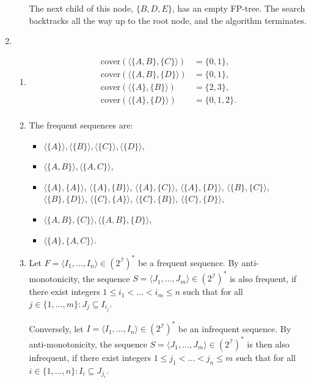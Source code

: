 \documentclass[pdf]{article}
\newcommand{\seq}[1]{\langle #1 \rangle}
\newcommand{\coverseq}[1]{\mathrm{cover}(\seq{#1})}
\begin{document}
\begin{enumerate}
\begin{enumerate}
		The next child of this node, \(\{B, D, E\}\), has an empty FP-tree.
		The search backtracks all the way up to the root node, and the algorithm terminates.
	\end{enumerate}
	\item \begin{enumerate}
		\item \begin{align*}
			\coverseq{\{A, B\}, \{C\}} &= \{0, 1\}, \\
			\coverseq{\{A, B\}, \{D\}} &= \{0, 1\}, \\
			\coverseq{\{A\}, \{B\}} &= \{2, 3\}, \\
			\coverseq{\{A\}, \{D\}} &= \{0, 1, 2\}. \\
		\end{align*}
		\item The frequent sequences are:
		\begin{itemize}
			\item \(\seq{\{A\}}, \seq{\{B\}}, \seq{\{C\}}, \seq{\{D\}}\),
			\item \(\seq{\{A, B\}}, \seq{\{A, C\}}\),
			\item \(\seq{\{A\}, \{A\}}\), \(\seq{\{A\}, \{B\}}\), \(\seq{\{A\}, \{C\}}\), \(\seq{\{A\}, \{D\}}\), \(\seq{\{B\}, \{C\}}\), \(\seq{\{B\}, \{D\}}\), \(\seq{\{C\}, \{A\}}\), \(\seq{\{C\}, \{B\}}\), \(\seq{\{C\}, \{D\}}\),
			\item \(\seq{\{A, B\}, \{C\}}, \seq{\{A, B\},\{D\}}\),
			\item \(\seq{\{A\}, \{A, C\}}\).
		\end{itemize}
		\item Let \(F = \langle I_1,\dots,I_n \rangle \in (2^\mathcal{I})^*\) be a frequent sequence.
		By anti-monotonicity, the sequence \(S = \langle J_1,\dots,J_m \rangle \in (2^\mathcal{I})^*\) is also frequent, if there exist integers \(1 \leq i_1 < \dots < i_m \leq n\) such that for all \(j\in\{1,\ldots,m\} : J_j \subseteq I_{i_j}\).
		
		Conversely, let \(I = \langle I_1,\dots,I_n \rangle \in (2^\mathcal{I})^*\) be an infrequent sequence.
		By anti-monotonicity, the sequence \(S = \langle J_1,\dots,J_m \rangle \in (2^\mathcal{I})^*\) is then also infrequent, if there exist integers \(1 \leq j_1 < \dots < j_n \leq m\) such that for all \(i\in\{1,\ldots,n\} : I_i \subseteq J_{j_i}\).
		

\end{enumerate}
\end{enumerate}
\end{document}
